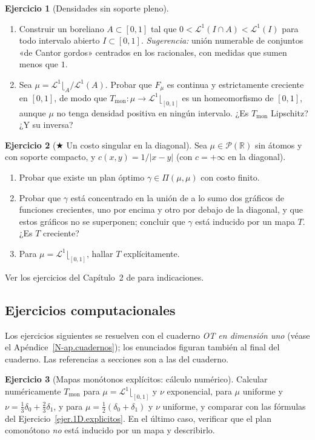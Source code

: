 \documentclass[11pt,a4paper]{amsart}
\newcounter{chapter}
\newcommand{\R}{{\mathbb R}}
\newcommand{\LL}{{\mathcal L}}
\theoremstyle{remark}
\theoremstyle{definition}
\newtheorem{ejercicio}{Ejercicio}[chapter]
\numberwithin{subsection}{section}
\numberwithin{equation}{section}
\begin{document}
\begin{ejercicio}[Densidades sin soporte pleno]\label{ejer.1D.boreliano}
\leavevmode
\begin{enumerate}[label=(\alph*)]
\item Construir un boreliano $A\subset[0,1]$ tal que
$0<\LL^1(I\cap A)<\LL^1(I)$ para todo intervalo abierto $I\subset[0,1]$.
\emph{Sugerencia:} unión numerable de conjuntos «de Cantor gordos»
centrados en los racionales, con medidas que sumen menos que $1$.
\item Sea $\mu=\LL^1\lfloor_A/\LL^1(A)$. Probar que $F_\mu$ es continua y
estrictamente creciente en $[0,1]$, de modo que $T_\text{mon}\colon\mu\to\LL^1\lfloor_{[0,1]}$
es un homeomorfismo de $[0,1]$, aunque $\mu$ no tenga densidad positiva en
ningún intervalo. ¿Es $T_\text{mon}$ Lipschitz? ¿Y su inversa?
\end{enumerate}
\end{ejercicio}

\begin{ejercicio}[$\bigstar$ Un costo singular en la diagonal]\label{ejer.1D.singular}
Sea $\mu\in\mathcal P(\R)$ sin átomos y con soporte compacto, y
$c(x,y)=1/|x-y|$ (con $c=+\infty$ en la diagonal).
\begin{enumerate}[label=(\alph*)]
\item Probar que existe un plan óptimo $\gamma\in\Pi(\mu,\mu)$ con costo
finito.
\item Probar que $\gamma$ está concentrado en la unión de a lo sumo dos
gráficos de funciones crecientes, uno por encima y otro por debajo de la
diagonal, y que estos gráficos no se superponen; concluir que $\gamma$ está
inducido por un mapa $T$. ¿Es $T$ creciente?
\item Para $\mu=\LL^1\lfloor_{[0,1]}$, hallar $T$ explícitamente.
\end{enumerate}
Ver los ejercicios del Capítulo~2 de \cite{Santambrogio} para indicaciones.
\end{ejercicio}

\subsection*{Ejercicios computacionales}

Los ejercicios siguientes se resuelven con el cuaderno \emph{OT en dimensión
uno} (véase el Apéndice~\ref{N-ap.cuadernos}); los enunciados figuran también al
final del cuaderno. Las referencias a secciones son a las del cuaderno.

\begin{ejercicio}[Mapas monótonos explícitos: cálculo numérico]\label{ejc.1D.explicitos}
Calcular numéricamente $T_{\mathrm{mon}}$ para $\mu=\LL^1\lfloor_{[0,1]}$ y
$\nu$ exponencial, para $\mu$ uniforme y $\nu=\frac13\delta_0+\frac23\delta_1$,
y para $\mu=\frac12(\delta_0+\delta_1)$ y $\nu$ uniforme, y comparar con las
fórmulas del Ejercicio~\ref{ejer.1D.explicitos}. En el último caso, verificar
que el plan comonótono \emph{no} está inducido por un mapa y describirlo.
\end{ejercicio}
\end{document}
